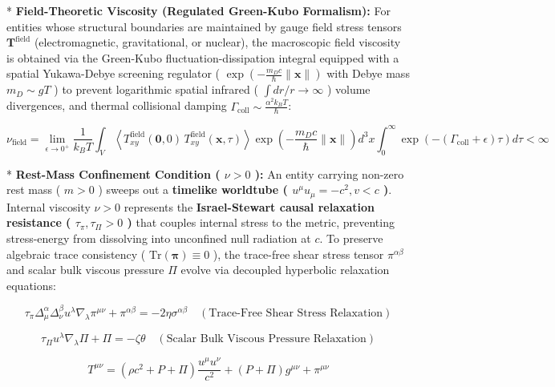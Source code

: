 \documentclass[11pt,a4paper]{article}
\theoremstyle{definition}\newtheorem{definition}{Definition}
\theoremstyle{remark}\newtheorem{remark}{Remark}
\begin{document}
* \textbf{Field-Theoretic Viscosity (Regulated Green-Kubo Formalism):} For entities whose structural boundaries are maintained by gauge field stress tensors $\mathbf{T}^{\text{field}}$ (electromagnetic, gravitational, or nuclear), the macroscopic field viscosity is obtained via the Green-Kubo fluctuation-dissipation integral equipped with a spatial Yukawa-Debye screening regulator ( $\exp(-\frac{m_D c}{\hbar}\|\mathbf{x}\|)$ with Debye mass $m_D \sim g T$ ) to prevent logarithmic spatial infrared ( $\int dr/r \to \infty$ ) volume divergences, and thermal collisional damping $\Gamma_{\text{coll}} \sim \frac{\alpha^2 k_B T}{\hbar}$:


\begin{equation}
\nu_{\text{field}} = \lim_{\epsilon \to 0^+} \frac{1}{k_B T} \int_V \left\langle T_{xy}^{\text{field}}(\mathbf{0}, 0) \, T_{xy}^{\text{field}}(\mathbf{x}, \tau) \right\rangle \exp\left( -\frac{m_D c}{\hbar}\|\mathbf{x}\| \right) d^3x \int_0^\infty \exp\left( -\left(\Gamma_{\text{coll}} + \epsilon\right)\tau \right) d\tau < \infty
\end{equation}


* \textbf{Rest-Mass Confinement Condition ( $\nu > 0$ ):} An entity carrying non-zero rest mass ( $m > 0$ ) sweeps out a \textbf{timelike worldtube ( $u^\mu u_\mu = -c^2, v < c$ )}. Internal viscosity $\nu > 0$ represents the \textbf{Israel-Stewart causal relaxation resistance ( $\tau_\pi, \tau_\Pi > 0$ )} that couples internal stress to the metric, preventing stress-energy from dissolving into unconfined null radiation at $c$. To preserve algebraic trace consistency ( $\mathrm{Tr}(\boldsymbol{\pi}) \equiv 0$ ), the trace-free shear stress tensor $\pi^{\alpha\beta}$ and scalar bulk viscous pressure $\Pi$ evolve via decoupled hyperbolic relaxation equations:


\begin{equation}
\boxed{\tau_\pi \Delta^\alpha_\mu \Delta^\beta_\nu u^\lambda \nabla_\lambda \pi^{\mu\nu} + \pi^{\alpha\beta} = -2\eta \sigma^{\alpha\beta} \quad (\text{Trace-Free Shear Stress Relaxation})}
\end{equation}



\begin{equation}
\boxed{\tau_\Pi u^\lambda \nabla_\lambda \Pi + \Pi = -\zeta \theta \quad (\text{Scalar Bulk Viscous Pressure Relaxation})}
\end{equation}



\begin{equation}
\boxed{T^{\mu\nu} = (\rho c^2 + P + \Pi) \frac{u^\mu u^\nu}{c^2} + (P + \Pi) g^{\mu\nu} + \pi^{\mu\nu}}
\end{equation}
\end{document}
